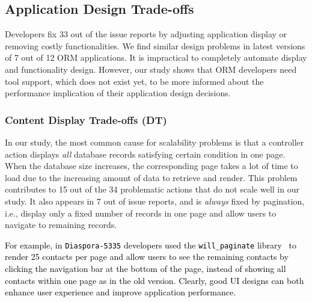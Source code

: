 \subsection{Application Design Trade-offs}
\label{sec:appdesign}

Developers fix 33 out of the \numissues issue reports by adjusting application display or removing costly functionalities. 
We find similar design problems in latest
versions of 7 out of 12 ORM applications. It is impractical to
completely automate display and functionality design. 
However, our study
shows that ORM developers need tool support, which does not exist yet, to be more informed about the performance implication of their application design decisions.
\vspace{-0.10in} 
\subsubsection{Content Display Trade-offs (DT)}
In our study, the most common cause for scalability problems is that a controller action displays \textit{all} database records satisfying certain condition in one page. When the database size increases, the corresponding page takes a lot of time to load due to the increasing amount of data to retrieve and render. This problem contributes to 15 out of the
34 problematic actions that do not scale well in our study. It also appears in 7 out of \numissues issue reports, and is \textit{always} fixed by pagination, i.e., display only a fixed number of records in one page and allow users to navigate to remaining records. 


\textcolor{black}{ For example, in \texttt{Diaspora-5335} %
developers used the \texttt{will\_paginate} library~\cite{gem:paginate} to render 25 contacts per page and allow users to see the remaining contacts by clicking the navigation bar at the bottom of the page, instead of showing all contacts within one page as in the old version.
Clearly, good UI designs can both enhance user experience and improve application performance.} 

